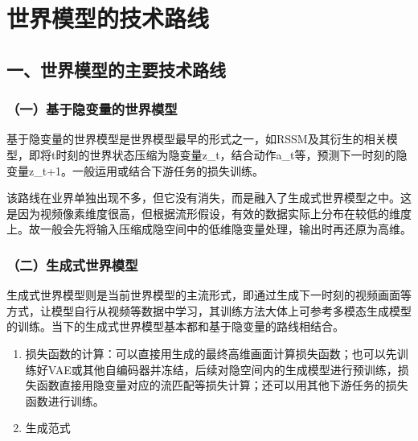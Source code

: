 \clearpage

\hypertarget{ux4e16ux754cux6a21ux578bux7684ux6280ux672fux8defux7ebf}{%
\section{世界模型的技术路线}\label{ux4e16ux754cux6a21ux578bux7684ux6280ux672fux8defux7ebf}}

\hypertarget{ux4e00ux4e16ux754cux6a21ux578bux7684ux4e3bux8981ux6280ux672fux8defux7ebf}{%
\subsection{一、世界模型的主要技术路线}\label{ux4e00ux4e16ux754cux6a21ux578bux7684ux4e3bux8981ux6280ux672fux8defux7ebf}}

\hypertarget{ux4e00ux57faux4e8eux9690ux53d8ux91cfux7684ux4e16ux754cux6a21ux578b}{%
\subsubsection{（一）基于隐变量的世界模型}\label{ux4e00ux57faux4e8eux9690ux53d8ux91cfux7684ux4e16ux754cux6a21ux578b}}

基于隐变量的世界模型是世界模型最早的形式之一，如RSSM及其衍生的相关模型，即将t时刻的世界状态压缩为隐变量z\_t，结合动作a\_t等，预测下一时刻的隐变量z\_t+1。一般运用或结合下游任务的损失训练。

该路线在业界单独出现不多，但它没有消失，而是融入了生成式世界模型之中。这是因为视频像素维度很高，但根据流形假设，有效的数据实际上分布在较低的维度上。故一般会先将输入压缩成隐空间中的低维隐变量处理，输出时再还原为高维。

\hypertarget{ux4e8cux751fux6210ux5f0fux4e16ux754cux6a21ux578b}{%
\subsubsection{（二）生成式世界模型}\label{ux4e8cux751fux6210ux5f0fux4e16ux754cux6a21ux578b}}

生成式世界模型则是当前世界模型的主流形式，即通过生成下一时刻的视频画面等方式，让模型自行从视频等数据中学习，其训练方法大体上可参考多模态生成模型的训练。当下的生成式世界模型基本都和基于隐变量的路线相结合。

\begin{enumerate}
\def\labelenumi{\arabic{enumi}.}
\item
  损失函数的计算：可以直接用生成的最终高维画面计算损失函数；也可以先训练好VAE或其他自编码器并冻结，后续对隐空间内的生成模型进行预训练，损失函数直接用隐变量对应的流匹配等损失计算；还可以用其他下游任务的损失函数进行训练。
\item
  生成范式
\end{enumerate}

